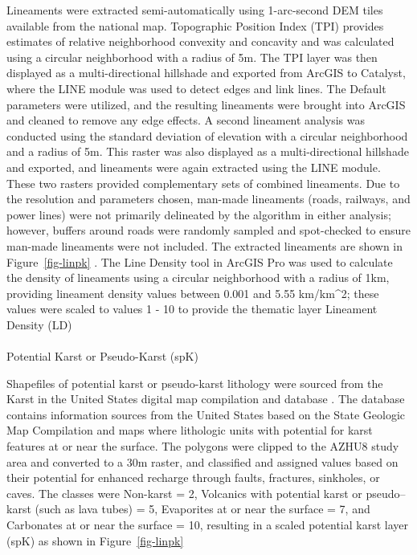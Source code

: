 \documentclass[
  number,
  preprint,
  3p,
  onecolumn]{elsarticle}
\makeatletter
\let\oldparagraph\paragraph
\renewcommand{\paragraph}{
    \@ifstar
      \xxxParagraphStar
      \xxxParagraphNoStar
  }
\newcommand{\xxxParagraphStar}[1]{\oldparagraph*{#1}\mbox{}}
\newcommand{\xxxParagraphNoStar}[1]{\oldparagraph{#1}\mbox{}}
\makeatother
\begin{document}
Lineaments were extracted semi-automatically using 1-arc-second DEM
tiles available from the national map. Topographic Position Index (TPI)
provides estimates of relative neighborhood convexity and concavity and
was calculated using a circular neighborhood with a radius of 5m. The
TPI layer was then displayed as a multi-directional hillshade and
exported from ArcGIS to Catalyst, where the LINE module was used to
detect edges and link lines. The Default parameters were utilized, and
the resulting lineaments were brought into ArcGIS and cleaned to remove
any edge effects. A second lineament analysis was conducted using the
standard deviation of elevation with a circular neighborhood and a
radius of 5m. This raster was also displayed as a multi-directional
hillshade and exported, and lineaments were again extracted using the
LINE module. These two rasters provided complementary sets of combined
lineaments. Due to the resolution and parameters chosen, man-made
lineaments (roads, railways, and power lines) were not primarily
delineated by the algorithm in either analysis; however, buffers around
roads were randomly sampled and spot-checked to ensure man-made
lineaments were not included. The extracted lineaments are shown in
Figure~\ref{fig-linpk} . The Line Density tool in ArcGIS Pro was used to
calculate the density of lineaments using a circular neighborhood with a
radius of 1km, providing lineament density values between 0.001 and 5.55
km/km\^{}2; these values were scaled to values 1 - 10 to provide the
thematic layer Lineament Density (LD)

\paragraph{Potential Karst or Pseudo-Karst
(spK)}\label{potential-karst-or-pseudo-karst-spk}

Shapefiles of potential karst or pseudo-karst lithology were sourced
from the Karst in the United States digital map compilation and database
\citep{weary2014}. The database contains information sources from the
United States based on the State Geologic Map Compilation and maps where
lithologic units with potential for karst features at or near the
surface. The polygons were clipped to the AZHU8 study area and converted
to a 30m raster, and classified and assigned values based on their
potential for enhanced recharge through faults, fractures, sinkholes, or
caves. The classes were Non-karst = 2, Volcanics with potential karst or
pseudo--karst (such as lava tubes) = 5, Evaporites at or near the
surface = 7, and Carbonates at or near the surface = 10, resulting in a
scaled potential karst layer (spK) as shown in Figure~\ref{fig-linpk}
\end{document}
